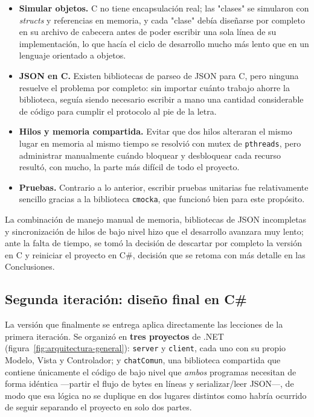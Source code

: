 \documentclass[11pt,letterpaper]{article}
\begin{document}
\begin{itemize}
  \item \textbf{Simular objetos.} C no tiene encapsulación real; las
        "clases" se simularon con \emph{structs} y referencias en memoria,
        y cada "clase" debía diseñarse por completo en su archivo de
        cabecera antes de poder escribir una sola línea de su
        implementación, lo que hacía el ciclo de desarrollo mucho más
        lento que en un lenguaje orientado a objetos.
  \item \textbf{JSON en C.} Existen bibliotecas de parseo de JSON para C,
        pero ninguna resuelve el problema por completo: sin importar cuánto
        trabajo ahorre la biblioteca, seguía siendo necesario escribir a
        mano una cantidad considerable de código para cumplir el protocolo
        al pie de la letra.
  \item \textbf{Hilos y memoria compartida.} Evitar que dos hilos alteraran
        el mismo lugar en memoria al mismo tiempo se resolvió con mutex de
        \texttt{pthreads}, pero administrar manualmente cuándo bloquear y
        desbloquear cada recurso resultó, con mucho, la parte más difícil
        de todo el proyecto.
  \item \textbf{Pruebas.} Contrario a lo anterior, escribir pruebas
        unitarias fue relativamente sencillo gracias a la biblioteca
        \texttt{cmocka}, que funcionó bien para este propósito.
\end{itemize}

La combinación de manejo manual de memoria, bibliotecas de JSON
incompletas y sincronización de hilos de bajo nivel hizo que el desarrollo
avanzara muy lento; ante la falta de tiempo, se tomó la decisión de
descartar por completo la versión en C y reiniciar el proyecto en C\#,
decisión que se retoma con más detalle en las Conclusiones.

\subsection{Segunda iteración: diseño final en C\#}

La versión que finalmente se entrega aplica directamente las lecciones de
la primera iteración. Se organizó en \textbf{tres proyectos} de .NET
(figura~\ref{fig:arquitectura-general}): \texttt{server} y
\texttt{client}, cada uno con su propio Modelo, Vista y Controlador; y
\texttt{chatComun}, una biblioteca compartida que contiene únicamente el
código de bajo nivel que \emph{ambos} programas necesitan de forma
idéntica —partir el flujo de bytes en líneas y serializar/leer JSON—, de
modo que esa lógica no se duplique en dos lugares distintos como habría
ocurrido de seguir separando el proyecto en solo dos partes.
\end{document}

